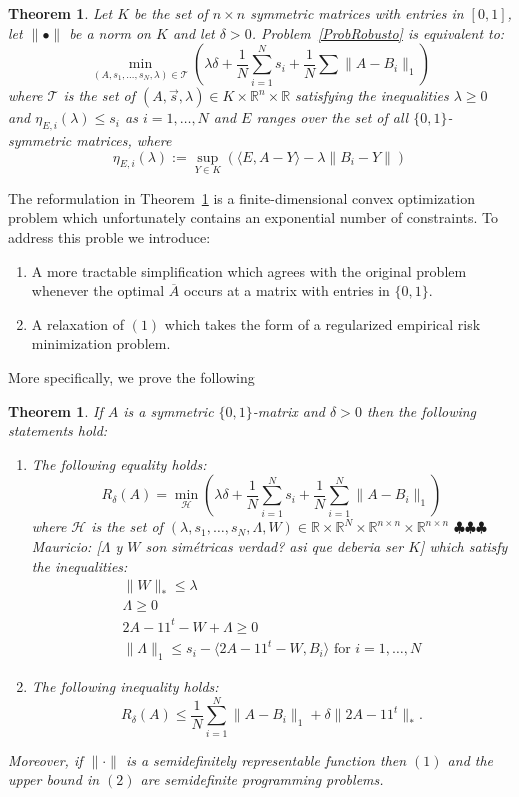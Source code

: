 \documentclass[12pt]{amsart}
\newtheorem{theorem}[lemma]{Theorem}
\theoremstyle{remark}
\newcommand{\RR}{\mathbb{R}}
\newcommand{\mv}[1]{{\color{red} \sf $\clubsuit\clubsuit\clubsuit$ Mauricio: [#1]}}
\begin{document}
\begin{theorem}\label{thm: finiteConvex} Let $K$ be the set of $n\times n$ symmetric matrices with entries in $[0,1]$, let $\|\bullet\|$ be a norm on $K$ and let $\delta>0$. Problem~\ref{ProbRobusto} is equivalent to:
\[\min_{(A,s_1,\dots, s_N,\lambda)\in \mathcal{T}}\left( \lambda\delta +\frac{1}{N}\sum_{i=1}^N s_i + \frac{1}{N}\sum \|A-B_i\|_1\right)\]
where $\mathcal{T}$ is the set of $(A,\vec{s},\lambda)\in K\times \RR^n\times \RR$  satisfying the inequalities $\lambda\geq 0$ and $\eta_{E, i}(\lambda)\leq s_i$ as $i=1,\dots, N$ and $E$ ranges over the set of all $\{0,1\}$-symmetric matrices, where
\[\eta_{E, i}(\lambda):= \sup_{Y\in K} \left(\langle E, A-Y\rangle -\lambda \|B_i-Y\|\right)\]
\end{theorem}

The reformulation in Theorem~\ref{thm: finiteConvex} is a finite-dimensional convex optimization problem which unfortunately contains  an exponential number of constraints. To address this proble we introduce:
\begin{enumerate}
\item A more tractable simplification which agrees with the original problem whenever the optimal $\overline{A}$ occurs at a matrix with entries in $\{0,1\}$.
\item A relaxation of $(1)$ which takes the form of a regularized empirical risk minimization problem.
\end{enumerate}
More specifically, we prove the following 

\begin{theorem}\label{Thm: tractable}If $A$ is a symmetric $\{0,1\}$-matrix and $\delta>0$ then the following statements hold:
\begin{enumerate}
\item{  The following equality holds:
\[
R_{\delta}(A)=\min_{\mathcal{H}} \left(\lambda\delta +\frac{1}{N}\sum_{i=1}^N s_i+\frac{1}{N}\sum_{i=1}^N\|A-B_i\|_1\right)
\]
where $\mathcal{H}$ is the set of $(\lambda, s_1,\dots, s_N,\Lambda, W)\in \RR\times\RR^N\times \RR^{n\times n} \times \RR^{n\times n}$ \mv{$\Lambda$ y $W$ son sim\'etricas verdad? asi que deberia ser $K$} which satisfy the inequalities:
\[
\begin{array}{l}
\|W\|_{*}\leq \lambda\\
\Lambda \geq 0\\
2A-11^t-W + \Lambda \geq 0\\
\|\Lambda\|_{1}\leq s_i-\langle 2A-11^t-W, B_i\rangle\text{ for $i=1,\dots, N$}
\end{array}
\]}
\item The following inequality holds:
\[R_{\delta}(A)\leq \frac{1}{N}\sum_{i=1}^N\|A-B_i\|_1+ \delta\|2A-11^t\|_*.\]
\end{enumerate}
Moreover, if $\|\cdot\|$ is a semidefinitely representable function then $(1)$ and the upper bound in $(2)$ are semidefinite programming problems.
\end{theorem}
\end{document}

